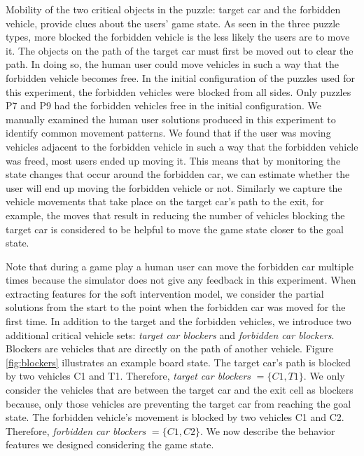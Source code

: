 Mobility of the two critical objects in the puzzle: target car and the forbidden vehicle, provide clues about the users' game state. As seen in the three puzzle types, more blocked the forbidden vehicle is the less likely the users are to move it. The objects on the path of the target car must first be moved out to clear the path. In doing so, the human user could move vehicles in such a way that the forbidden vehicle becomes free. In the initial configuration of the puzzles used for this experiment, the forbidden vehicles were blocked from all sides. Only puzzles P7 and P9 had the forbidden vehicles free in the initial configuration. We manually examined the human user solutions produced in this experiment to identify common movement patterns. We found that if the user was moving vehicles adjacent to the forbidden vehicle in such a way that the forbidden vehicle was freed, most users ended up moving it. This means that by monitoring the state changes that occur around the forbidden car, we can estimate whether the user will end up moving the forbidden vehicle or not. Similarly we capture the vehicle movements that take place on the target car's path to the exit, for example, the moves that result in reducing the number of vehicles blocking the target car is considered to be helpful to move the game state closer to the goal state.

Note that during a game play a human user can move the forbidden car multiple times because the simulator does not give any feedback in this experiment. When extracting features for the soft intervention model, we consider the partial solutions from the start to the point when the forbidden car was moved for the first time. In addition to the target and the forbidden vehicles, we introduce two additional critical vehicle sets: \textit{target car blockers} and \textit{forbidden car blockers}. Blockers are vehicles that are  directly on the path of another vehicle. Figure \ref{fig:blockers} illustrates an example board state. The target car's path is blocked by two vehicles C1 and T1. Therefore, \textit{target car blockers} $= \lbrace C1, T1\rbrace$. We only consider the vehicles that are between the target car and the exit cell as blockers because, only those vehicles are preventing the target car from reaching the goal state. The forbidden vehicle's movement is blocked by two vehicles C1 and C2. Therefore, \textit{forbidden car blockers} $=\lbrace C1, C2\rbrace$. We now describe the behavior features we designed considering the game state.

